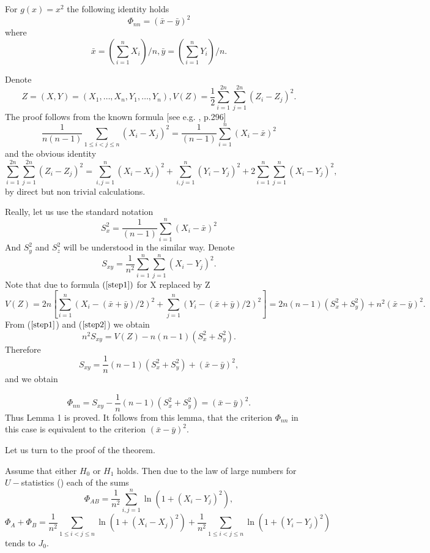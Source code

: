 \documentclass{svproc}
\begin{document}
\begin{lemma} For $g(x)= x^2$ the following identity holds
$$
\Phi_{nn}= (\bar x - \bar y)^2
$$
where
$$
\bar x = (\sum_{i=1}^n X_i)/n,
\bar y = (\sum_{i=1}^n Y_i)/n.
$$
\end{lemma}
Denote
$$ 
 Z=(X,Y)= (X_1,\dots, X_n,Y_1,\dots, Y_n),
V(Z)=\frac{1}{2}\sum_{i=1}^{2n}\sum_{j=1}^{2n} (Z_i-Z_j)^2.
$$
The proof follows from the known formula [see e.g. \cite{Hoeffding}, p.296]
\begin{equation}\label{step1} 
\frac {1}{n(n-1)}\sum_{1\leq i<j\leq n
} (X_i-X_j)^2=\frac {1}{(n-1)} \sum_{i=1}^n (X_i - \bar x)^2
\end{equation}
and the obvious identity
\begin{equation}\label{step2}
\sum_{i=1}^{2n}\sum_{j=1}^{2n} (Z_i-Z_j)^2=\sum_{i,j=1}^n(X_i-X_j)^2+
\sum_{i,j=1}^n (Y_i-Y_j)^2+2\sum_{i=1}^n\sum_{j=1}^n (X_i-Y_j)^2,
\end{equation}
by  direct but non trivial  calculations. 

Really, let us use the standard notation
$$
S_x^2=\frac {1}{(n-1)} \sum_{i=1}^n (X_i - \bar x)^2
$$
And  $S_y^2$ and $S_z^2$ will be understood in the similar way.
Denote 
$$
S_{xy}=\frac{1}{n^2}\sum_{i=1}^n\sum_{j=1}^n (X_i-Y_j)^2.
$$
Note that due to formula $(\ref{step1})$ for X replaced by Z
\begin{equation}\label{step3a}
V(Z)=2n[\sum_{i=1}^n(X_i- (\bar x + \bar y)/2)^2 +\sum_{j=1}^n(Y_i- (\bar x + \bar y)/2)^2] = 2n(n-1) (S_x^2 + S_y^2) +n^2(\bar x- \bar y)^2.
\end{equation}
From ($\ref{step1}$) and  ($\ref{step2}$) we obtain
\begin{equation}\label{step3}
n^2S_{xy}=V(Z)-n(n-1)(S_x^2+S_y^2).
\end{equation}
Therefore
$$
S_{xy} =\frac{1}{n}(n-1)(S_x^2+S_y^2)+ (\bar x-\bar y)^2,
$$
and we obtain

$$
\Phi_{nn}= S_{xy} - \frac{1}{n}(n-1)(S_x^2+S_y^2)=(\bar x - \bar y)^2.  
$$
Thus Lemma 1 is proved.
It follows from this lemma, that the criterion $\Phi_{nn}$ in this case is equivalent to the criterion $(\bar x - \bar y)^2.$

Let us turn to the proof of the theorem.

Assume that either $H_0$ or $H_1$ holds. Then due to the law of large numbers for $U-$statistics (\cite{Hoeffding}) each of the sums 
$$
\Phi_{AB}=\frac{1}{n^2}\sum_{i,j=1}^n \ln(1 + (X_i - Y_j)^2),
$$
$$
\Phi_{A}+ \Phi_{B}=\frac{1}{n^2}\sum_{1\leq i<j\leq n}  \ln(1 + (X_i - X_j)^2)+
\frac{1}{n^2}\sum_{1\leq i<j\leq n}  \ln(1 + (Y_i - Y_j)^2)
$$
tends to $J_0$. 
\end{document}
